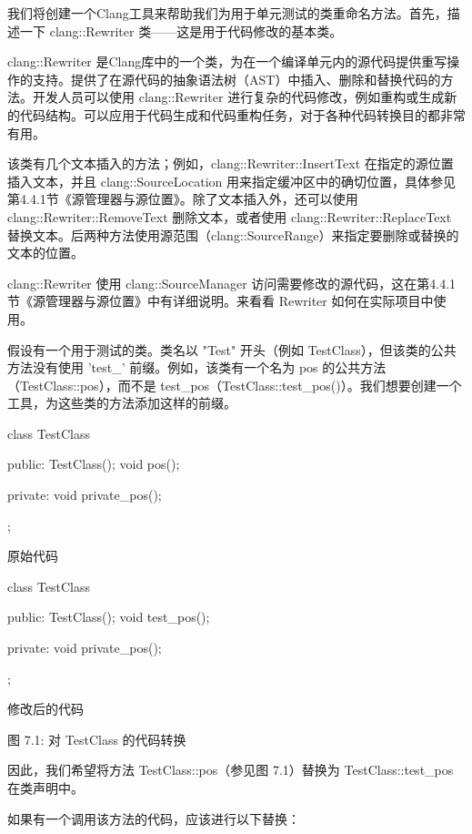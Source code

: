 我们将创建一个Clang工具来帮助我们为用于单元测试的类重命名方法。首先，描述一下 clang::Rewriter 类——这是用于代码修改的基本类。


clang::Rewriter 是Clang库中的一个类，为在一个编译单元内的源代码提供重写操作的支持。提供了在源代码的抽象语法树（AST）中插入、删除和替换代码的方法。开发人员可以使用 clang::Rewriter 进行复杂的代码修改，例如重构或生成新的代码结构。可以应用于代码生成和代码重构任务，对于各种代码转换目的都非常有用。

该类有几个文本插入的方法；例如，clang::Rewriter::InsertText 在指定的源位置插入文本，并且 clang::SourceLocation 用来指定缓冲区中的确切位置，具体参见第4.4.1节《源管理器与源位置》。除了文本插入外，还可以使用 clang::Rewriter::RemoveText 删除文本，或者使用 clang::Rewriter::ReplaceText 替换文本。后两种方法使用源范围（clang::SourceRange）来指定要删除或替换的文本的位置。

clang::Rewriter 使用 clang::SourceManager 访问需要修改的源代码，这在第4.4.1节《源管理器与源位置》中有详细说明。来看看 Rewriter 如何在实际项目中使用。


假设有一个用于测试的类。类名以 "Test" 开头（例如 TestClass），但该类的公共方法没有使用 'test\_' 前缀。例如，该类有一个名为 pos 的公共方法（TestClass::pos），而不是 test\_pos（TestClass::test\_pos()）。我们想要创建一个工具，为这些类的方法添加这样的前缀。

\begin{cpp}
class TestClass {
public:
  TestClass(){};
  void pos(){};

private:
  void private_pos(){};
};
\end{cpp}

原始代码

\begin{cpp}
class TestClass {
public:
  TestClass(){};
  void test_pos(){};

private:
  void private_pos(){};
};
\end{cpp}

修改后的代码

\begin{center}
图 7.1: 对 TestClass 的代码转换
\end{center}


因此，我们希望将方法 TestClass::pos（参见图 7.1）替换为 TestClass::test\_pos 在类声明中。

如果有一个调用该方法的代码，应该进行以下替换：

